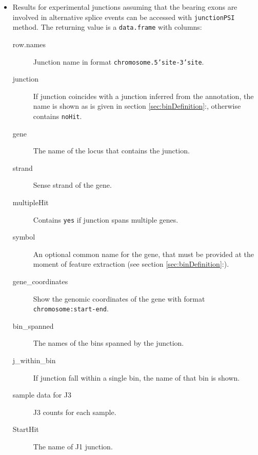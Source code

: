\documentclass{article}
\newcommand{\secref}[1]{\ref{#1}:\nameref{#1}}
\begin{document}
\begin{itemize}
  \item Results for experimental junctions assuming that the bearing
  exons are involved in alternative splice events can be accessed with
  \texttt{junctionPSI} method. The returning value is a \texttt{data.frame} with
  columns:
    \begin{description}
      \item[row.names] Junction name in format \texttt{chromosome.5'site-3'site}.
      \item[junction] If junction coincides with a junction inferred
      from the annotation, the name is shown as is given in section
      \ref{sec:binDefinition}:, otherwise
      contains \texttt{noHit}.
      \item[gene] The name of the locus that contains the junction.
      \item[strand] Sense strand of the gene.
      \item[multipleHit] Contains \texttt{yes} if junction spans multiple
      genes.
      \item[symbol] An optional common name for the gene, that must be provided at
      the moment of feature extraction (see section
      \secref{sec:binDefinition}).
      \item[gene\_coordinates] Show the genomic coordinates of the gene with
      format \texttt{chromosome:start-end}.
      \item[bin\_spanned] The names of the bins spanned by the junction.
      \item[j\_within\_bin] If junction fall within a single bin, the name of
      that bin is shown.
      \item[sample data for J3] J3 counts for each sample.
      \item[StartHit] The name of J1 junction.

\end{description}
\end{itemize}
\end{document}
